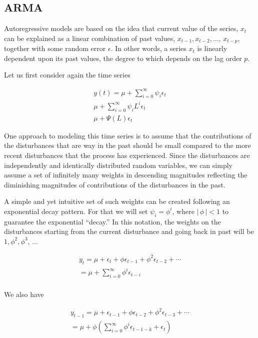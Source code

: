 \documentclass[
  11pt,
]{article}
\begin{document}
\hypertarget{arma}{%
\subsection{ARMA}\label{arma}}

Autoregressive models are based on the idea that current value of the
series, \(x_{t}\) can be explained as a linear combination of past
values, \(x_{t-1}, x_{t-2}, \ldots, \, x_{t-p}\), together with some
random error \(\epsilon\). In other words, a series \(x_{t}\) is
linearly dependent upon its past values, the degree to which depends on
the lag order \(p\).

Let us first consider again the time series

\begin{gather*}
y(t) = \mu + \sum\limits_{i= 0}^{\infty}\psi_{i}\epsilon_{t} \\[8pt]
\mu + \sum\limits_{i=0}^{\infty}\psi_{i}L^{i}\epsilon_{t} \\[8pt]
\mu + \Psi(L)\epsilon_{t}
\end{gather*}

One approach to modeling this time series is to assume that the
contributions of the disturbances that are way in the past should be
small compared to the more recent disturbances that the process has
experienced. Since the disturbances are independently and identically
distributed random variables, we can simply assume a set of infinitely
many weights in descending magnitudes reflecting the diminishing
magnitudes of contributions of the disturbances in the past.

A simple and yet intuitive set of such weights can be created following
an exponential decay pattern. For that we will set
\(\psi_{i} = \phi^{i}\), where \(\left|\,\phi\,\right| < 1\) to
guarantee the exponential ``decay.'' In this notation, the weights on
the disturbances starting from the current disturbance and going back in
past will be \(1, \phi^{2}, \phi^{3},\, \ldots\)

\begin{gather*}
y_{t} = \mu + \epsilon_{t} + \phi\epsilon_{t-1} + \phi^{2}\epsilon_{t-2} + \cdots\\[8pt]
= \mu + \sum\limits_{i=0}^{\infty}\phi^{i}\epsilon_{t-i}
\\[8pt]
\end{gather*}

We also have

\begin{gather*}
y_{t-1} = \mu + \epsilon_{t-1} + \phi\epsilon_{t-2} + \phi^{2}\epsilon_{t-3} + \cdots \\[8pt]
= \mu + \phi\left(\sum\limits_{i=0}^{\infty}\phi^{i}\epsilon_{t-1-k} + \epsilon_{t}\right)
\end{gather*}
\end{document}
